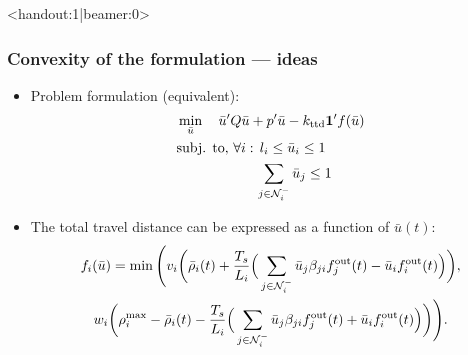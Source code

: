 \begin{frame}<handout:1|beamer:0>
\frametitle{Convexity of the formulation --- ideas}
    \begin{itemize}
    
    \item Problem formulation (equivalent):
    \[
    \begin{aligned}
    & \min_{\bar{u}}\quad \bar{u}' Q \bar{u} + p' \bar{u} - k_{\text{ttd}}\mathbf{1}'f(\bar{u}) \\
    & \text{subj. to, }\forall i:\, l_i\leq\bar{u}_i\leq 1 \\
    & \phantom{\text{subj. to, }\forall i:\,} \sum_{j\in\neighUp_i}\bar{u}_j \leq 1
    \end{aligned}
    \]
    
    \item The total travel distance can be expressed as a function of $\bar{u}(t)$:
    \begin{multline*}
    f_i(\bar{u}) = \min\Bigg( v_i \bigg( \bar{\rho}_i(t) + \frac{T_s}{L_i}\Big(\sum_{j\in\mathcal{N}^-_i} \bar{u}_j\beta_{ji} f^\text{out}_j(t) - \bar{u}_i f^\text{out}_i(t) \Big) \bigg), \\
    w_i \bigg( \rho^\text{max}_i - \bar{\rho}_i(t) - \frac{T_s}{L_i}\Big(\sum_{j\in\mathcal{N}^-_i} \bar{u}_j\beta_{ji} f^\text{out}_j(t) + \bar{u}_i f^\text{out}_i(t) \Big) \bigg) \Bigg).
    \end{multline*}
    \end{itemize}
\end{frame}